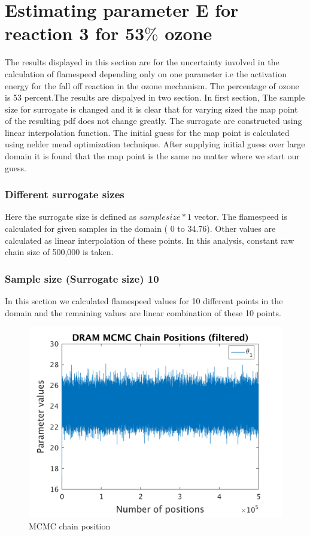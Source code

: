 \section{Estimating parameter E for reaction 3 for 53$\%$ ozone }

The results displayed in this section are for the uncertainty involved in the calculation of flamespeed depending only on one parameter i.e the activation energy for the fall off reaction in the ozone mechanism. The percentage of ozone is 53 percent.The results are dispalyed in two section. In first section, The sample size for surrogate is changed and it is clear that for varying sized the map point of the resulting pdf does not change greatly. The surrogate are constructed using linear interpolation function. The initial guess for the map point is calculated using nelder mead optimization technique. After supplying initial guess over large domain it is found that the map point is the same no matter where we start our guess. 
\bigskip

\subsubsection{Different surrogate sizes }

 Here the surrogate size is defined as $sample size*1$ vector. The flamespeed is calculated for given samples in the domain ( 0 to 34.76). Other values are calculated as linear interpolation of these points. In this analysis, constant raw chain size of 500,000 is taken. 
\subsubsection{Sample size (Surrogate size) 10 }
In this section we calculated flamespeed values for 10 different points in the domain and the remaining values are linear combination of these 10 points.  
\begin{figure}[H]
  
  \centering
   \includegraphics[scale=0.75]{100_results/outputData_10/simple_ip_chain_pos_filt}
   \caption{MCMC chain position }
\end{figure}


